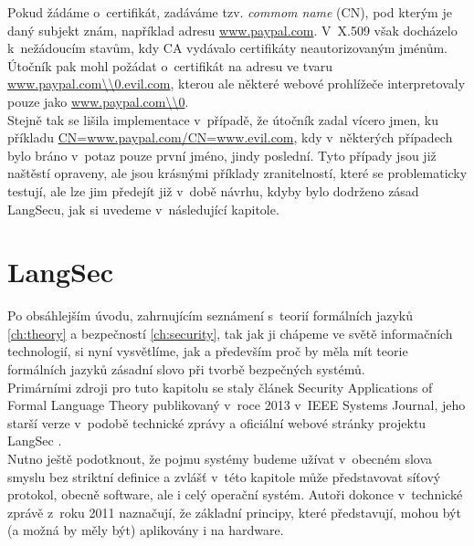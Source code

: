 Pokud žádáme o~certifikát, zadáváme tzv. \textit{commom name} (CN), pod kterým je daný subjekt znám, 
například adresu \url{www.paypal.com}. V~X.509 však docházelo k~nežádoucím stavům, kdy CA vydávalo certifikáty neautorizovaným jménům. 
Útočník pak mohl požádat o~certifikát na adresu ve tvaru \url{www.paypal.com\\0.evil.com}, kterou ale některé webové prohlížeče interpretovaly 
pouze jako \url{www.paypal.com\\0}. \\

Stejně tak se lišila implementace v~případě, že útočník zadal vícero jmen, ku příkladu \url{CN=www.paypal.com/CN=www.evil.com}, kdy v~některých 
případech bylo bráno v~potaz pouze první jméno, jindy poslední. Tyto případy jsou již naštěstí opraveny, ale jsou krásnými příklady zranitelností, 
které se problematicky testují, ale lze jim předejít již v~době návrhu, kdyby bylo dodrženo zásad LangSecu, jak si uvedeme v~následující kapitole.\\

\chapter{LangSec}\label{ch:langsec}
Po obsáhlejším úvodu, zahrnujícím seznámení s~teorií formálních jazyků \ref{ch:theory} a bezpečností \ref{ch:security}, tak jak ji chápeme ve světě 
informačních technologií, si nyní vysvětlíme, jak a především proč by měla mít teorie formálních jazyků zásadní slovo při tvorbě bezpečných systémů. \\

Primárními zdroji pro tuto kapitolu se staly článek Security Applications of Formal Language Theory \cite{Sass2013} publikovaný v~roce 2013 v~IEEE 
Systems Journal, jeho starší verze v~podobě technické zprávy \cite{Sass2011} a oficiální webové stránky projektu LangSec \cite{LangSecWeb}. \\

Nutno ještě podotknout, že pojmu systémy budeme užívat v~obecném slova smyslu bez striktní definice a zvlášť v~této kapitole může představovat 
síťový protokol, obecně software, ale i celý operační systém. Autoři dokonce v~technické zprávě z~roku 2011 \cite[str. 23]{Sass2011} naznačují, 
že základní principy, které představují, mohou být (a možná by měly být) aplikovány i na hardware. \\

